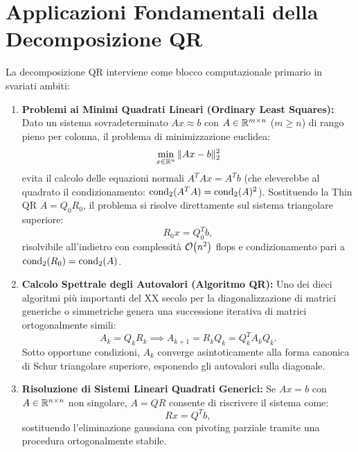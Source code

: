 \FloatBarrier
\section{Applicazioni Fondamentali della Decomposizione QR}
\label{sec:applicazioni-qr}

La decomposizione QR interviene come blocco computazionale primario in svariati ambiti:

\begin{enumerate}
    \item \textbf{Problemi ai Minimi Quadrati Lineari (Ordinary Least Squares):}
    Dato un sistema sovradeterminato $Ax \approx b$ con $A \in \mathbb{R}^{m \times n}$ ($m \ge n$) di rango pieno per colonna, il problema di minimizzazione euclidea:
    \begin{equation}
        \min_{x \in \mathbb{R}^n} \|Ax - b\|_2^2
    \end{equation}
    evita il calcolo delle equazioni normali $A^T A x = A^T b$ (che eleverebbe al quadrato il condizionamento: $\operatorname{cond}_2(A^T A) = \operatorname{cond}_2(A)^2$). Sostituendo la Thin QR $A = Q_0 R_0$, il problema si risolve direttamente sul sistema triangolare superiore:
    \begin{equation}
        R_0 x = Q_0^T b,
    \end{equation}
    risolvibile all'indietro con complessit\`a $\mathcal{O}\!\left(n^2\right)$ flops e condizionamento pari a $\operatorname{cond}_2(R_0) = \operatorname{cond}_2(A)$.
    
    \item \textbf{Calcolo Spettrale degli Autovalori (Algoritmo QR):}
    Uno dei dieci algoritmi pi\`u importanti del XX secolo per la diagonalizzazione di matrici generiche o simmetriche genera una successione iterativa di matrici ortogonalmente simili:
    \begin{equation}
        A_k = Q_k R_k \implies A_{k+1} = R_k Q_k = Q_k^T A_k Q_k.
    \end{equation}
    Sotto opportune condizioni, $A_k$ converge asintoticamente alla forma canonica di Schur triangolare superiore, esponendo gli autovalori sulla diagonale.

    \item \textbf{Risoluzione di Sistemi Lineari Quadrati Generici:}
    Se $Ax = b$ con $A \in \mathbb{R}^{n \times n}$ non singolare, $A = QR$ consente di riscrivere il sistema come:
    \begin{equation}
        R x = Q^T b,
    \end{equation}
    sostituendo l'eliminazione gaussiana con pivoting parziale tramite una procedura ortogonalmente stabile.


\end{enumerate}
